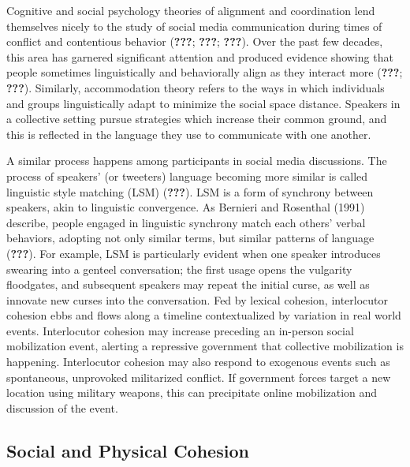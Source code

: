 \documentclass[english,man]{apa6}
\begin{document}
Cognitive and social psychology theories of alignment and coordination lend themselves nicely to the study of social media communication during times of conflict and contentious behavior ({\textbf{???}}; {\textbf{???}}; {\textbf{???}}). Over the past few decades, this area has garnered significant attention and produced evidence showing that people sometimes linguistically and behaviorally align as they interact more ({\textbf{???}}; {\textbf{???}}). Similarly, accommodation theory refers to the ways in which individuals and groups linguistically adapt to minimize the social space distance. Speakers in a collective setting pursue strategies which increase their common ground, and this is reflected in the language they use to communicate with one another.

A similar process happens among participants in social media discussions. The process of speakers' (or tweeters) language becoming more similar is called linguistic style matching (LSM) ({\textbf{???}}). LSM is a form of synchrony between speakers, akin to linguistic convergence. As Bernieri and Rosenthal (1991) describe, people engaged in linguistic synchrony match each others' verbal behaviors, adopting not only similar terms, but similar patterns of language ({\textbf{???}}). For example, LSM is particularly evident when one speaker introduces swearing into a genteel conversation; the first usage opens the vulgarity floodgates, and subsequent speakers may repeat the initial curse, as well as innovate new curses into the conversation. Fed by lexical cohesion, interlocutor cohesion ebbs and flows along a timeline contextualized by variation in real world events. Interlocutor cohesion may increase preceding an in-person social mobilization event, alerting a repressive government that collective mobilization is happening. Interlocutor cohesion may also respond to exogenous events such as spontaneous, unprovoked militarized conflict. If government forces target a new location using military weapons, this can precipitate online mobilization and discussion of the event.

\hypertarget{social-and-physical-cohesion}{%
\subsection{Social and Physical Cohesion}\label{social-and-physical-cohesion}}
\end{document}
